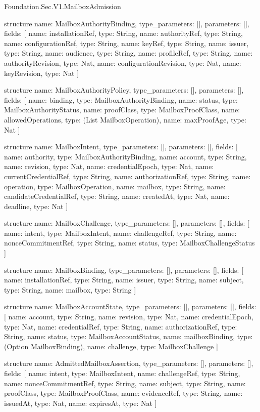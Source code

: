 \begin{lexlean}{Foundation.Sec.V1.MailboxAdmission}
\begin{semanticmodule}
structure{
  name: MailboxAuthorityBinding,
  type_parameters: [],
  parameters: [],
  fields: [
    {name: installationRef, type: String},
    {name: authorityRef, type: String},
    {name: configurationRef, type: String},
    {name: keyRef, type: String},
    {name: issuer, type: String},
    {name: audience, type: String},
    {name: profileRef, type: String},
    {name: authorityRevision, type: Nat},
    {name: configurationRevision, type: Nat},
    {name: keyRevision, type: Nat}
  ]
}

structure{
  name: MailboxAuthorityPolicy,
  type_parameters: [],
  parameters: [],
  fields: [
    {name: binding, type: MailboxAuthorityBinding},
    {name: status, type: MailboxAuthorityStatus},
    {name: proofClass, type: MailboxProofClass},
    {name: allowedOperations, type: (List MailboxOperation)},
    {name: maxProofAge, type: Nat}
  ]
}

structure{
  name: MailboxIntent,
  type_parameters: [],
  parameters: [],
  fields: [
    {name: authority, type: MailboxAuthorityBinding},
    {name: account, type: String},
    {name: revision, type: Nat},
    {name: credentialEpoch, type: Nat},
    {name: currentCredentialRef, type: String},
    {name: authorizationRef, type: String},
    {name: operation, type: MailboxOperation},
    {name: mailbox, type: String},
    {name: candidateCredentialRef, type: String},
    {name: createdAt, type: Nat},
    {name: deadline, type: Nat}
  ]
}

structure{
  name: MailboxChallenge,
  type_parameters: [],
  parameters: [],
  fields: [
    {name: intent, type: MailboxIntent},
    {name: challengeRef, type: String},
    {name: nonceCommitmentRef, type: String},
    {name: status, type: MailboxChallengeStatus}
  ]
}

structure{
  name: MailboxBinding,
  type_parameters: [],
  parameters: [],
  fields: [
    {name: installationRef, type: String},
    {name: issuer, type: String},
    {name: subject, type: String},
    {name: mailbox, type: String}
  ]
}

structure{
  name: MailboxAccountState,
  type_parameters: [],
  parameters: [],
  fields: [
    {name: account, type: String},
    {name: revision, type: Nat},
    {name: credentialEpoch, type: Nat},
    {name: credentialRef, type: String},
    {name: authorizationRef, type: String},
    {name: status, type: MailboxAccountStatus},
    {name: mailboxBinding, type: (Option MailboxBinding)},
    {name: challenge, type: MailboxChallenge}
  ]
}

structure{
  name: AdmittedMailboxAssertion,
  type_parameters: [],
  parameters: [],
  fields: [
    {name: intent, type: MailboxIntent},
    {name: challengeRef, type: String},
    {name: nonceCommitmentRef, type: String},
    {name: subject, type: String},
    {name: proofClass, type: MailboxProofClass},
    {name: evidenceRef, type: String},
    {name: issuedAt, type: Nat},
    {name: expiresAt, type: Nat}
  ]
}


\end{semanticmodule}
\end{lexlean}

